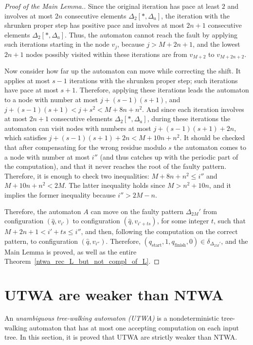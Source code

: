 \documentclass[12pt,a4paper]{article}
\theoremstyle{definition}
\begin{document}
\begin{proof}[Proof of the Main Lemma.]
Since the original iteration has pace at least $2$
and involves at most $2n$ consecutive elements $\Delta_2[*,\Delta_a]$,
the iteration with the shrunken proper step has positive pace
and involves at most $2n+1$ consecutive elements $\Delta_2[*,\Delta_a]$.
Thus, the automaton cannot reach the fault by applying such iterations
starting in the node $v_j$, because $j > M+2n+1$,
and the lowest $2n+1$ nodes possibly visited within these iterations
are from $v_{M+2}$ to $v_{M+2n+2}$.

Now consider how far up the automaton can move while correcting the shift.
It applies at most $s-1$ iterations with the shrunken proper step;
such iterations have pace at most $s+1$.
Therefore, applying these iterations leads the automaton
to a node with number at most $j+(s-1)(s+1)$,
and $j+(s-1)(s+1) < j+s^2 < M+8n+n^2$.
And since each iteration involves at most $2n+1$ consecutive elements $\Delta_2[*,\Delta_a]$,
during these iterations the automaton can visit nodes with numbers 
at most $j+(s-1)(s+1)+2n$, which satisfies $j+(s-1)(s+1)+2n < M+10n+n^2$.
It should be checked that after compensating for the wrong residue modulo $s$ 
the automaton comes to a node with number at most $i''$
(and thus catches up with the periodic part of the computation),
and that it never reaches the root of the faulty pattern.
Therefore, it is enough to check two inequalities:
$M+8n+n^2 \leqslant i''$ and $M+10n+n^2 < 2M$.
The latter inequality holds since $M > n^2+10n$,
and it implies the former inequality because $i'' > 2M-n$.

Therefore, the automaton $A$ can move on the faulty pattern $\Delta_{2M}'$
from configuration $(\widehat{q},v_{i'})$
to configuration $(\widehat{q},v_{i'+ts})$,
for some integer $t$, such that $M+2n+1 < i'+ts \leqslant i''$,
and then, following the computation on the correct pattern,
to configuration $(\widehat{q},v_{i''})$.
Therefore, $(q_{\text{start}},1,q_{\text{finish}},0) \in \delta_{\Delta_{2M}'}$,
and the Main Lemma is proved,
as well as the entire Theorem~\ref{ntwa_rec_L_but_not_compl_of_L}.
\end{proof}






\section{UTWA are weaker than NTWA}\label{section_utwa_weaker_than_ntwa}

An \emph{unambiguous tree-walking automaton (UTWA)}
is a nondeterministic tree-walking automaton
that has at most one accepting computation
on each input tree.
In this section, it is proved that UTWA are strictly weaker than NTWA.
\end{document}

